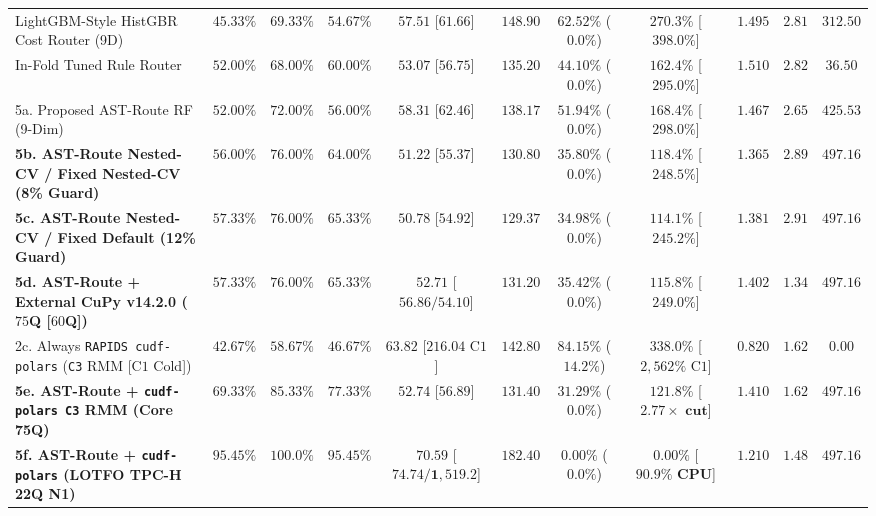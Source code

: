 \documentclass[10pt,a4paper]{article}
\newenvironment{fitasttable}{%
  \begin{lrbox}{\asttblbox}%
}{%
  \end{lrbox}%
  \sbox{\asttblboxB}{%
    \ifdim\wd\asttblbox>0.96\textwidth
      \resizebox{0.96\textwidth}{!}{\usebox{\asttblbox}}%
    \else
      \usebox{\asttblbox}%
    \fi
  }%
  \ifdim\ht\asttblboxB>0.72\textheight
    \resizebox{!}{0.72\textheight}{\usebox{\asttblboxB}}%
  \else
    \usebox{\asttblboxB}%
  \fi
}
\begin{document}
\begin{table}[!htbp]
\begin{fitasttable}
{\begin{tabular}{@{}lcccccccccc@{}}
LightGBM-Style HistGBR Cost Router (9D) & $45.33\%$ & $69.33\%$ & $54.67\%$ & $57.51$ [$61.66$] & $148.90$ & $62.52\%$ ($0.0\%$) & $270.3\%$ [$398.0\%$] & $1.495$ & $2.81$ & $312.50$ \\
In-Fold Tuned Rule Router & $52.00\%$ & $68.00\%$ & $60.00\%$ & $53.07$ [$56.75$] & $135.20$ & $44.10\%$ ($0.0\%$) & $162.4\%$ [$295.0\%$] & $1.510$ & $2.82$ & $36.50$ \\
5a. Proposed AST-Route RF (9-Dim) & $52.00\%$ & $72.00\%$ & $56.00\%$ & $58.31$ [$62.46$] & $138.17$ & $51.94\%$ ($0.0\%$) & $168.4\%$ [$298.0\%$] & $1.467$ & $2.65$ & $425.53$ \\
\textbf{5b. AST-Route Nested-CV / Fixed Nested-CV (8\% Guard)} & $\mathbf{56.00\%}$ & $\mathbf{76.00\%}$ & $\mathbf{64.00\%}$ & $\mathbf{51.22}$ [$\mathbf{55.37}$] & $\mathbf{130.80}$ & $\mathbf{35.80\%}$ ($\mathbf{0.0\%}$) & $\mathbf{118.4\%}$ [$\mathbf{248.5\%}$] & $\mathbf{1.365}$ & $\mathbf{2.89}$ & $\mathbf{497.16}$ \\
\textbf{5c. AST-Route Nested-CV / Fixed Default (12\% Guard)} & $\mathbf{57.33\%}$ & $\mathbf{76.00\%}$ & $\mathbf{65.33\%}$ & $\mathbf{50.78}$ [$\mathbf{54.92}$] & $\mathbf{129.37}$ & $\mathbf{34.98\%}$ ($\mathbf{0.0\%}$) & $\mathbf{114.1\%}$ [$\mathbf{245.2\%}$] & $\mathbf{1.381}$ & $\mathbf{2.91}$ & $\mathbf{497.16}$ \\
\textbf{5d. AST-Route + External CuPy v14.2.0 ($75$Q [$60$Q])} & $\mathbf{57.33\%}$ & $\mathbf{76.00\%}$ & $\mathbf{65.33\%}$ & $\mathbf{52.71}$ [$\mathbf{56.86 / 54.10}$] & $\mathbf{131.20}$ & $\mathbf{35.42\%}$ ($\mathbf{0.0\%}$) & $\mathbf{115.8\%}$ [$\mathbf{249.0\%}$] & $\mathbf{1.402}$ & $\mathbf{1.34}$ & $\mathbf{497.16}$ \\
2c. Always \texttt{RAPIDS cudf-polars} (\texttt{C3} RMM [$\text{C1}$ Cold]) & $42.67\%$ & $58.67\%$ & $46.67\%$ & $63.82$ [$216.04\text{ C1}$] & $142.80$ & $84.15\%$ ($14.2\%$) & $338.0\%$ [$2{,}562\%\text{ C1}$] & $0.820$ & $1.62$ & $0.00$ \\
\textbf{5e. AST-Route + \texttt{cudf-polars C3} RMM (Core 75Q)} & $\mathbf{69.33\%}$ & $\mathbf{85.33\%}$ & $\mathbf{77.33\%}$ & $\mathbf{52.74}$ [$\mathbf{56.89}$] & $\mathbf{131.40}$ & $\mathbf{31.29\%}$ ($\mathbf{0.0\%}$) & $\mathbf{121.8\%}$ [$\mathbf{2.77\times\text{ cut}}$] & $\mathbf{1.410}$ & $\mathbf{1.62}$ & $\mathbf{497.16}$ \\
\textbf{5f. AST-Route + \texttt{cudf-polars} (LOTFO TPC-H 22Q N1)} & $\mathbf{95.45\%}$ & $\mathbf{100.0\%}$ & $\mathbf{95.45\%}$ & $\mathbf{70.59}$ [$\mathbf{74.74 / 1{,}519.2}$] & $\mathbf{182.40}$ & $\mathbf{0.00\%}$ ($\mathbf{0.0\%}$) & $\mathbf{0.00\%}$ [$\mathbf{90.9\%\text{ CPU}}$] & $\mathbf{1.210}$ & $\mathbf{1.48}$ & $\mathbf{497.16}$ \\

\end{tabular}}
\end{fitasttable}
\end{table}
\end{document}
